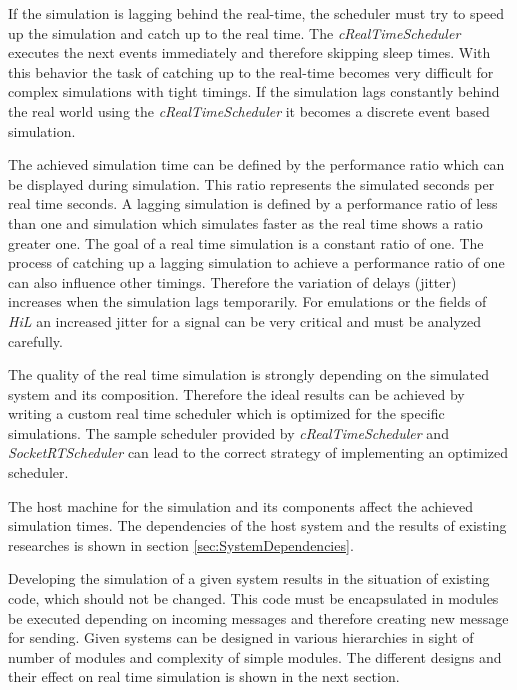 If the simulation is lagging behind the real-time, the scheduler must try to speed up the simulation and catch up to the real time.
The \emph{cRealTimeScheduler} executes the next events immediately and therefore skipping sleep times.
With this behavior the task of catching up to the real-time becomes very difficult for complex simulations with tight timings.
If the simulation lags constantly behind the real world using the \emph{cRealTimeScheduler} it becomes a discrete event based simulation.

The achieved simulation time can be defined by the performance ratio which can be displayed during simulation.
This ratio represents the simulated seconds per real time seconds.
A lagging simulation is defined by a performance ratio of less than one and simulation which simulates faster as the real time shows a ratio greater one.
The goal of a real time simulation is a constant ratio of one.
The process of catching up a lagging simulation to achieve a performance ratio of one can also influence other timings.
Therefore the variation of delays (jitter) increases when the simulation lags temporarily.
For emulations or the fields of \emph{HiL} an increased jitter for a signal can be very critical and must be analyzed carefully.

The quality of the real time simulation is strongly depending on the simulated system and its composition.
Therefore the ideal results can be achieved by writing a custom real time scheduler which is optimized for the specific simulations.
The sample scheduler provided by \emph{cRealTimeScheduler} and \emph{SocketRTScheduler} can lead to the correct strategy of implementing an optimized scheduler.

The host machine for the simulation and its components affect the achieved simulation times.
The dependencies of the host system and the results of existing researches is shown in section \ref{sec:SystemDependencies}. %

Developing the simulation of a given system results in the situation of existing code, which should not be changed.
This code must be encapsulated in modules be executed depending on incoming messages and therefore creating new message for sending.
Given systems can be designed in various hierarchies in sight of number of modules and complexity of simple modules.
The different designs and their effect on real time simulation is shown in the next section.

